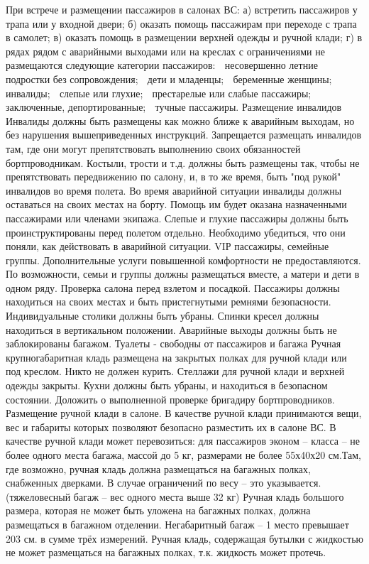 При встрече и размещении пассажиров в салонах ВС:
а)	встретить пассажиров у трапа или у входной двери;
б)	оказать помощь пассажирам при переходе с трапа в самолет;
в)	оказать помощь в размещении верхней одежды и ручной клади;
г)	в рядах рядом с аварийными выходами или на креслах с ограничениями не размещаются следующие категории пассажиров:
	несовершенно летние подростки без сопровождения;
	дети и младенцы;
	беременные женщины;
	инвалиды;
	слепые или глухие;
	престарелые или слабые пассажиры;
	заключенные, депортированные;
	тучные пассажиры.
Размещение инвалидов
Инвалиды должны быть размещены как можно ближе к аварийным выходам, но без нарушения вышеприведенных инструкций.
Запрещается размещать инвалидов там, где они могут препятствовать выполнению своих обязанностей бортпроводникам.
Костыли, трости и т.д. должны быть размещены так, чтобы не препятствовать передвижению по салону, и, в то же время, быть "под рукой" инвалидов во время полета. Во время аварийной ситуации инвалиды должны оставаться на своих местах на борту. Помощь им будет оказана назначенными пассажирами или членами экипажа.
Слепые и глухие пассажиры должны быть проинструктированы перед полетом отдельно.
Необходимо убедиться, что они поняли, как действовать в аварийной ситуации.
VIР пассажиры, семейные группы.
Дополнительные услуги повышенной комфортности не предоставляются.
По возможности, семьи и группы должны размещаться вместе, а матери и дети в одном ряду.
Проверка салона перед взлетом и посадкой.
Пассажиры должны находиться на своих местах и быть пристегнутыми ремнями безопасности.
Индивидуальные столики должны быть убраны.
Спинки кресел должны находиться в вертикальном положении.
Аварийные выходы должны быть не заблокированы багажом.
Туалеты - свободны от пассажиров и багажа
Ручная крупногабаритная кладь размещена на закрытых полках для ручной клади или под креслом.
Никто не должен курить.
Стеллажи для ручной клади и верхней одежды закрыты.
Кухни должны быть убраны, и находиться в безопасном состоянии.
Доложить о выполненной проверке бригадиру бортпроводников.
Размещение ручной клади в салоне.
В качестве ручной клади принимаются вещи, вес и габариты которых позволяют безопасно разместить их в салоне ВС. В качестве ручной клади может перевозиться: для пассажиров эконом – класса – не более одного места багажа, массой до 5 кг, размерами не более 55х40х20 см.Там, где возможно, ручная кладь должна размещаться на багажных полках, снабженных дверками. В случае ограничений по весу – это указывается. (тяжеловесный багаж – вес одного места выше 32 кг) Ручная кладь большого размера, которая не может быть уложена на багажных полках, должна размещаться в багажном отделении. Негабаритный багаж – 1 место превышает 203 см. в сумме трёх измерений. Ручная кладь, содержащая бутылки с жидкостью не может размещаться на багажных полках, т.к. жидкость может протечь.
